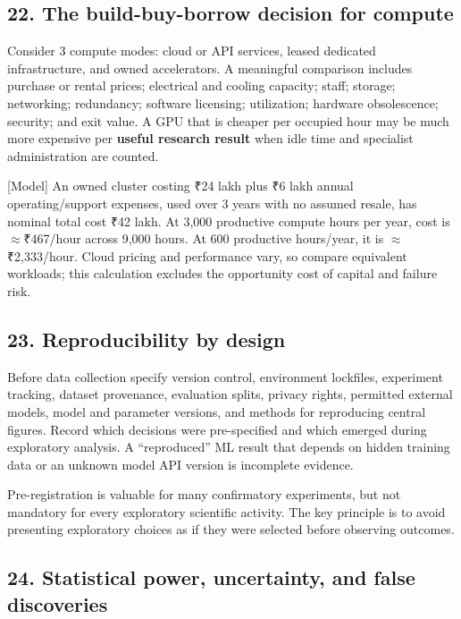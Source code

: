 \subsection{22. The build-buy-borrow decision for compute}

Consider 3 compute modes: cloud or API services, leased dedicated infrastructure, and owned accelerators. A meaningful comparison includes purchase or rental prices; electrical and cooling capacity; staff; storage; networking; redundancy; software licensing; utilization; hardware obsolescence; security; and exit value. A GPU that is cheaper per occupied hour may be much more expensive per \textbf{useful research result} when idle time and specialist administration are counted.

[Model] An owned cluster costing ₹24 lakh plus ₹6 lakh annual operating/support expenses, used over 3 years with no assumed resale, has nominal total cost ₹42 lakh. At 3,000 productive compute hours per year, cost is $\approx$\textnormal{₹}467/hour across 9,000 hours. At 600 productive hours/year, it is $\approx$\textnormal{₹}2,333/hour. Cloud pricing and performance vary, so compare equivalent workloads; this calculation excludes the opportunity cost of capital and failure risk.

\subsection{23. Reproducibility by design}

Before data collection specify version control, environment lockfiles, experiment tracking, dataset provenance, evaluation splits, privacy rights, permitted external models, model and parameter versions, and methods for reproducing central figures. Record which decisions were pre-specified and which emerged during exploratory analysis. A ``reproduced'' ML result that depends on hidden training data or an unknown model API version is incomplete evidence.

Pre-registration is valuable for many confirmatory experiments, but not mandatory for every exploratory scientific activity. The key principle is to avoid presenting exploratory choices as if they were selected before observing outcomes.

\subsection{24. Statistical power, uncertainty, and false discoveries}


